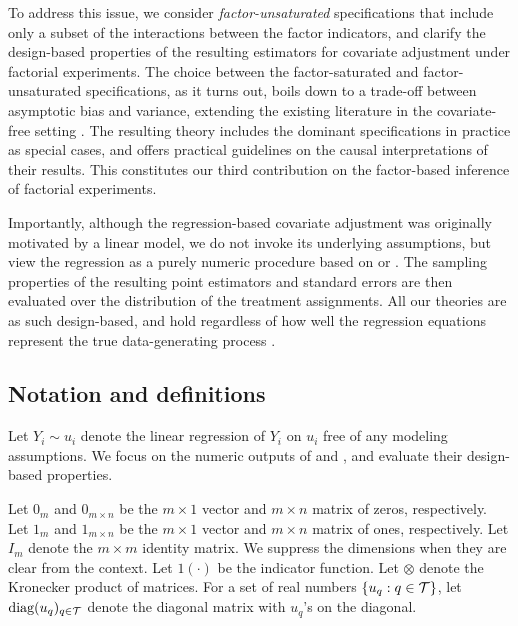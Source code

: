 \documentclass[11pt]{article}
\theoremstyle{definition}
\begin{document}
To address this issue, we consider {\it factor-unsaturated} specifications that include only a subset of the interactions between the factor indicators, and clarify the design-based properties of the resulting \olss estimators for covariate adjustment under factorial experiments.
The choice between the factor-saturated and factor-unsaturated specifications, as it turns out, boils down to a trade-off between asymptotic bias and variance, extending the existing literature in the covariate-free setting \citep{ZDa}.  
The resulting theory includes the dominant specifications in practice as special cases, and offers practical guidelines on the causal interpretations of their results.
This constitutes our third contribution on the factor-based inference of factorial experiments. 


Importantly, although the regression-based covariate adjustment was originally motivated by a linear model, we do not invoke its underlying assumptions, but view the regression as a purely numeric procedure based on \olss or \rls. 
%
The sampling properties of the resulting point estimators and standard errors are then evaluated over the distribution of the treatment assignments. 
All our theories are as such design-based, and hold regardless of how well the regression equations represent the true data-generating process \citep[see, e.g.,][]{Freedman08a, Freedman2008b, Schochet10,  Lin13, PostStratYu, CausalImbens, LassoTE16, schochet2018design, fogarty2018regression,  liu2020regression, abadie2020sampling, guo2021generalized}. 





\subsection{Notation and definitions}
\label{sec::notation+definition}
Let $Y_i \sim u_i$ denote the linear regression of $Y_i$ on $u_i$ free of any modeling assumptions. 
We focus on the numeric outputs of \olss and  \rols, and evaluate their design-based properties.


Let $0_{m}$ and $0_{m\times n}$ be the $m\times 1$ vector and $m \times n$ matrix of  zeros, respectively. 
Let  $1_{m}$ and $1_{m\times n}$ be the $m\times 1$ vector and $m\times n$ matrix of ones, respectively.
Let $I_m $ denote the $m\times m$ identity matrix. 
We suppress the dimensions when they are clear from the context. 
Let $1(\cdot)$ be the indicator function. 
Let $\otimes$ denote the Kronecker product of matrices. 
For a set of real numbers $\{u_q: q \in \mathcal{T}\}$, let 
$\text{diag}(u_q)_{q\in\mathcal{T}}$ denote the diagonal matrix  with $u_q$'s on the diagonal. 
\end{document}
